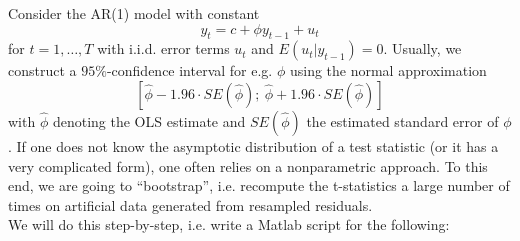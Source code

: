\documentclass{article}
\begin{document}
Consider the AR(1) model with constant
\begin{equation*}
y_{t}=c +\phi y_{t-1}+u_{t}
\end{equation*}
for $t=1,\ldots ,T$ with i.i.d. error terms $u_{t}$ and $E(u_{t}|y_{t-1})=0$.
Usually, we construct a $95\%$-confidence interval for e.g. $\phi$ using the normal approximation
\begin{equation*}
\left[ \hat{\phi}-1.96\cdot SE(\hat{\phi});\ \hat{\phi}+1.96\cdot SE(\hat{\phi})\right]
\end{equation*}
with $\hat{\phi}$ denoting the OLS estimate and $SE(\hat{\phi})$ the estimated standard error of $\phi$. If one does not know the asymptotic distribution of a test statistic (or it has a very complicated form), one often relies on a nonparametric approach. To this end, we are going to \enquote{bootstrap}, i.e. recompute the t-statistics a large number of times on artificial data generated from resampled residuals.\\
We will do this step-by-step, i.e. write a Matlab script for the following:
\end{document}
